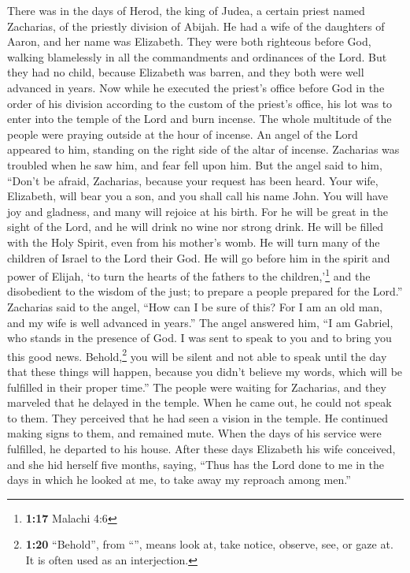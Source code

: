  There was in the days of Herod, the king of Judea, a
certain priest named Zacharias, of the priestly division of Abijah. He
had a wife of the daughters of Aaron, and her name was Elizabeth.
 They were both righteous before God, walking blamelessly
in all the commandments and ordinances of the Lord.  But
they had no child, because Elizabeth was barren, and they both were well
advanced in years.  Now while he executed the priest's
office before God in the order of his division  according
to the custom of the priest's office, his lot was to enter into the
temple of the Lord and burn incense.  The whole multitude
of the people were praying outside at the hour of incense.
 An angel of the Lord appeared to him, standing on the
right side of the altar of incense.  Zacharias was
troubled when he saw him, and fear fell upon him.  But
the angel said to him, ``Don't be afraid, Zacharias, because your
request has been heard. Your wife, Elizabeth, will bear you a son, and
you shall call his name John.  You will have joy and
gladness, and many will rejoice at his birth.  For he
will be great in the sight of the Lord, and he will drink no wine nor
strong drink. He will be filled with the Holy Spirit, even from his
mother's womb.  He will turn many of the children of
Israel to the Lord their God.  He will go before him in
the spirit and power of Elijah, `to turn the hearts of the fathers to
the children,'\footnote{\textbf{1:17} Malachi 4:6} and the disobedient
to the wisdom of the just; to prepare a people prepared for the Lord.''
 Zacharias said to the angel, ``How can I be sure of
this? For I am an old man, and my wife is well advanced in years.''
 The angel answered him, ``I am Gabriel, who stands in
the presence of God. I was sent to speak to you and to bring you this
good news.  Behold,\footnote{\textbf{1:20} ``Behold'',
  from ``'', means look at, take notice, observe, see, or
  gaze at. It is often used as an interjection.} you will be silent and
not able to speak until the day that these things will happen, because
you didn't believe my words, which will be fulfilled in their proper
time.''  The people were waiting for Zacharias, and they
marveled that he delayed in the temple.  When he came
out, he could not speak to them. They perceived that he had seen a
vision in the temple. He continued making signs to them, and remained
mute.  When the days of his service were fulfilled, he
departed to his house.  After these days Elizabeth his
wife conceived, and she hid herself five months, saying, 
``Thus has the Lord done to me in the days in which he looked at me, to
take away my reproach among men.''

